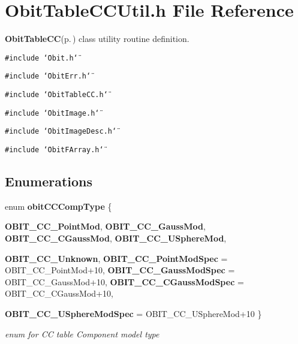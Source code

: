 \section{Obit\-Table\-CCUtil.h File Reference}
\label{ObitTableCCUtil_8h}
{\bf Obit\-Table\-CC}{\rm (p.\,\pageref{structObitTableCC})} class utility routine definition. 

{\tt \#include \char`\"{}Obit.h\char`\"{}}\par
{\tt \#include \char`\"{}Obit\-Err.h\char`\"{}}\par
{\tt \#include \char`\"{}Obit\-Table\-CC.h\char`\"{}}\par
{\tt \#include \char`\"{}Obit\-Image.h\char`\"{}}\par
{\tt \#include \char`\"{}Obit\-Image\-Desc.h\char`\"{}}\par
{\tt \#include \char`\"{}Obit\-FArray.h\char`\"{}}\par
\subsection*{Enumerations}
\begin{CompactItemize}
\item 
enum {\bf obit\-CCComp\-Type} \{ \par
{\bf OBIT\_\-CC\_\-Point\-Mod}, 
{\bf OBIT\_\-CC\_\-Gauss\-Mod}, 
{\bf OBIT\_\-CC\_\-CGauss\-Mod}, 
{\bf OBIT\_\-CC\_\-USphere\-Mod}, 
\par
{\bf OBIT\_\-CC\_\-Unknown}, 
{\bf OBIT\_\-CC\_\-Point\-Mod\-Spec} =  OBIT\_\-CC\_\-Point\-Mod+10, 
{\bf OBIT\_\-CC\_\-Gauss\-Mod\-Spec} =  OBIT\_\-CC\_\-Gauss\-Mod+10, 
{\bf OBIT\_\-CC\_\-CGauss\-Mod\-Spec} =  OBIT\_\-CC\_\-CGauss\-Mod+10, 
\par
{\bf OBIT\_\-CC\_\-USphere\-Mod\-Spec} =  OBIT\_\-CC\_\-USphere\-Mod+10
 \}
\begin{CompactList}\small\item\em enum for CC table Component model type \item\end{CompactList}\end{CompactItemize}
